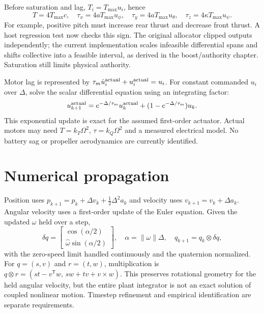 Before saturation and lag, $T_i=T_{\max}u_i$, hence
\begin{equation}
T=4T_{\max}c,\quad\tau_x=4aT_{\max}u_\phi,\quad
\tau_y=4aT_{\max}u_\theta,\quad\tau_z=4\kappa T_{\max}u_\psi.
\end{equation}
For example, positive pitch must increase rear thrust and decrease front
thrust. A host regression test now checks this sign. The original allocator clipped outputs independently; the current implementation
scales infeasible differential spans and shifts collective into a feasible interval,
as derived in the boost/authority chapter. Saturation still limits physical authority.

Motor lag is represented by $\tau_m\dot u_i^{\rm actual}+u_i^{\rm actual}=u_i$.
For constant commanded $u_i$ over $\Delta$, solve the scalar differential
equation using an integrating factor:
\begin{equation}
u^{\rm actual}_{k+1}=e^{-\Delta/\tau_m}u^{\rm actual}_k
 +(1-e^{-\Delta/\tau_m})u_k.
\end{equation}
This exponential update is exact for the assumed first-order actuator. Actual
motors may need $T=k_T\Omega^2$, $\tau=k_Q\Omega^2$ and a measured electrical
model. No battery sag or propeller aerodynamics are currently identified.

\section{Numerical propagation}
Position uses $p_{k+1}=p_k+\Delta v_k+\tfrac12\Delta^2a_k$ and velocity uses
$v_{k+1}=v_k+\Delta a_k$. Angular velocity uses a first-order update of the
Euler equation. Given the updated $\omega$ held over a step,
\begin{equation}
\delta q=\begin{bmatrix}\cos(\alpha/2)\\
\hat\omega\sin(\alpha/2)\end{bmatrix},\quad
\alpha=\|\omega\|\Delta,\quad q_{k+1}=q_k\otimes\delta q,
\end{equation}
with the zero-speed limit handled continuously and the quaternion normalized.
For $q=(s,v)$ and $r=(t,w)$, multiplication is
$q\otimes r=(st-v^{\mathsf T}w,\,sw+tv+v\times w)$.
This preserves rotational geometry for the held angular velocity, but the
entire plant integrator is not an exact solution of coupled nonlinear motion.
Timestep refinement and empirical identification are separate requirements.


